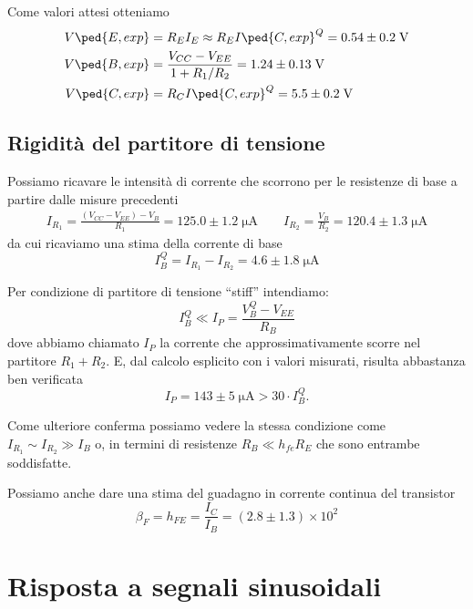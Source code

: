 \documentclass[10pt,a4paper]{article}
\begin{document}
Come valori attesi otteniamo
\begin{align*}
V\ped{E, exp} &= R_E I_E \approx R_E I\ped{C, exp}^Q = 0.54 \pm 0.2 \; \si{\V} \\
V\ped{B, exp} &= \frac{V_{CC} - V_{EE}}{1 + R_1/R_2} = 1.24 \pm 0.13 \; \si{\V}
\\
V\ped{C, exp} &= R_C I\ped{C, exp}^Q = 5.5 \pm 0.2 \; \si{V} \\
\end{align*}
\subsection{Rigidità del partitore di tensione}
Possiamo ricavare le intensità di corrente che scorrono per le resistenze
di base a partire dalle misure precedenti
\begin{align*}
I_{R_1} = \frac{(V_{CC} - V_{EE}) - V_B}{R_1} = 125.0 \pm 1.2 \; \si{\micro\A} \qquad
I_{R_2} = \frac{V_B}{R_2} = 120.4 \pm 1.3 \; \si{\micro\A} 
\end{align*}
da cui ricaviamo una stima della corrente di base
\[
I_B^Q = I_{R_1} - I_{R_2} =  4.6 \pm 1.8 \; \si{\micro\A}
\]

Per condizione di partitore di tensione ``stiff'' intendiamo:
\begin{equation}
I_B^Q \ll I_P = \frac{V_B^Q - V_{EE}}{R_B}
\end{equation}
dove abbiamo chiamato $I_P$ la corrente che approssimativamente scorre nel
partitore $R_1 + R_2$.
E, dal calcolo esplicito con i valori misurati, risulta abbastanza ben
verificata
\[
I_P = 143 \pm 5 \; \si{\micro\A} > 30 \cdot I_B^Q
.\] 

Come ulteriore conferma possiamo vedere la stessa condizione come 
$I_{R_1} \sim I_{R_2} \gg I_{B}$ o, in termini di resistenze
$R_B \ll h_{fe} R_E$ che sono entrambe soddisfatte.

Possiamo anche dare una stima del guadagno in corrente continua del transistor
\[
\beta_F = h_{FE} = \frac{I_C}{I_B} = (2.8 \pm 1.3) \times 10^{2}  
\]

\section{Risposta a segnali sinusoidali}
\end{document}
